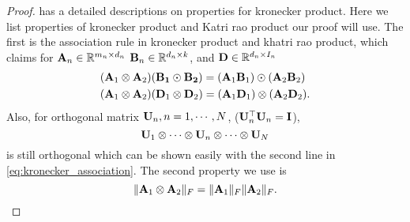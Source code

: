 \begin{proof}
\citep{schacke2013kronecker} has a detailed descriptions on properties for kronecker product. Here we list properties of kronecker product and Katri rao product our proof will use.  The first is the association rule in kronecker product and khatri rao product, which claims for $\mathbf{A}_n \in \mathbb{R}^{m_n\times d_n}$ 
$\mathbf{B}_n \in \mathbb{R}^{d_n\times k}$, and $\mathbf{D}\in \mathbb{R}^{d_n\times I_n}$
\begin{equation}
\label{eq:kronecker_association}
\begin{aligned}
& (\mathbf{A}_1\otimes  \mathbf{A}_2)(\mathbf{B_1} \odot  \mathbf{B_2}) = (\mathbf{A}_1\mathbf{B}_1)\odot   (\mathbf{A}_2\mathbf{B}_2)\\
& (\mathbf{A}_1\otimes  \mathbf{A}_2)(\mathbf{D}_1 \otimes  \mathbf{D}_2) = (\mathbf{A}_1\mathbf{D}_1)\otimes  (\mathbf{A}_2\mathbf{D}_2).
\end{aligned}
\end{equation}
Also, for orthogonal matrix $\mathbf{U}_n, n = 1, \cdots, N$, ($\mathbf{U}^\top_n \mathbf{U}_n = \mathbf{I}$),  
\[
\mathbf{U}_1 \otimes \cdots \otimes \mathbf{U}_n \otimes \cdots \otimes \mathbf{U}_N
\]
is still orthogonal which can be shown easily with the second line in \eqref{eq:kronecker_association}.  The second property we use is 
\begin{equation}
\label{eq:kronecker_product}
\|\mathbf{A}_1 \otimes \mathbf{A}_2\|_F = \|\mathbf{A}_1\|_F \|\mathbf{A}_2\|_F. 
\end{equation}




\end{proof}
